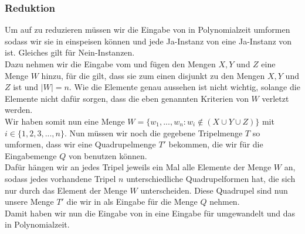 \documentclass[a4paper]{article}
\begin{document}
			\subsubsection*{Reduktion}
			Um \threedmatching auf \fourdmatching zu reduzieren müssen wir die Eingabe von \threedmatching in Polynomialzeit umformen sodass wir sie in \fourdmatching einspeisen können und jede Ja-Instanz von \threedmatching eine Ja-Instanz von \fourdmatching ist. Gleiches gilt für Nein-Instanzen.\\
			Dazu nehmen wir die Eingabe vom \threedmatching und fügen den Mengen $X,Y$ und $Z$ eine Menge $W$ hinzu, für die gilt, dass sie zum einen disjunkt zu den Mengen $X,Y$ und $Z$ ist und $|W| = n$. Wie die Elemente genau aussehen ist nicht wichtig, solange die Elemente nicht dafür sorgen, dass die eben genannten Kriterien von $W$ verletzt werden.\\
			Wir haben somit nun eine Menge $W = \{w_1, ... , w_n : w_i \notin (X\cup Y\cup Z)\} $ mit $i \in \{ 1, 2, 3, ... , n \} $.\n
			Nun müssen wir noch die gegebene Tripelmenge $T$ so umformen, dass wir eine Quadrupelmenge $ T' $ bekommen, die wir für die Eingabemenge $Q$ von \fourdmatching benutzen können.\\
			Dafür hängen wir an jedes Tripel jeweils ein Mal alle Elemente der Menge $W$ an, sodass jedes vorhandene Tripel $n$ unterschiedliche Quadrupelformen hat, die sich nur durch das Element der Menge $W$ unterscheiden. Diese Quadrupel sind nun unsere Menge $T'$ die wir in \fourdmatching als Eingabe für die Menge $Q$ nehmen.\\
			Damit haben wir nun die Eingabe von \threedmatching in eine Eingabe für \fourdmatching umgewandelt und das in Polynomialzeit.
\end{document}
